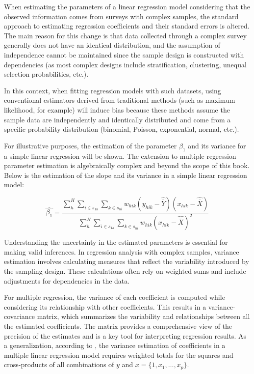 \documentclass[
  12pt,
]{book}
\begin{document}
When estimating the parameters of a linear regression model considering that the observed information comes from surveys with complex samples, the standard approach to estimating regression coefficients and their standard errors is altered. The main reason for this change is that data collected through a complex survey generally does not have an identical distribution, and the assumption of independence cannot be maintained since the sample design is constructed with dependencies (as most complex designs include stratification, clustering, unequal selection probabilities, etc.).

In this context, when fitting regression models with such datasets, using conventional estimators derived from traditional methods (such as maximum likelihood, for example) will induce bias because these methods assume the sample data are independently and identically distributed and come from a specific probability distribution (binomial, Poisson, exponential, normal, etc.).

For illustrative purposes, the estimation of the parameter \(\beta_{1}\) and its variance for a simple linear regression will be shown. The extension to multiple regression parameter estimation is algebraically complex and beyond the scope of this book. Below is the estimation of the slope and its variance in a simple linear regression model:

\[
\widehat{\beta_{1}} = \frac{\sum_{h}^{H} \sum_{i \in s_{1h}}\sum_{k \in s_{hi}} w_{h i k} \left(y_{h i k} - \widehat{\overline{Y}} \right) \left(x_{h i k} - \widehat{\overline{X}} \right)} {\sum_{h}^{H} \sum_{i \in s_{1h}}\sum_{k \in s_{hi}} w_{h i k} \left(x_{h i k} - \widehat{\overline{X}} \right)^{2}}
\]

Understanding the uncertainty in the estimated parameters is essential for making valid inferences. In regression analysis with complex samples, variance estimation involves calculating measures that reflect the variability introduced by the sampling design. These calculations often rely on weighted sums and include adjustments for dependencies in the data.

For multiple regression, the variance of each coefficient is computed while considering its relationship with other coefficients. This results in a variance-covariance matrix, which summarizes the variability and relationships between all the estimated coefficients. The matrix provides a comprehensive view of the precision of the estimates and is a key tool for interpreting regression results. As a generalization, according to \citet{kish1974inference}, the variance estimation of coefficients in a multiple linear regression model requires weighted totals for the squares and cross-products of all combinations of \(y\) and \(x = \{1, x_{1}, \ldots, x_{p}\}\).
\end{document}
